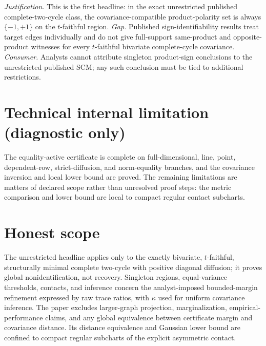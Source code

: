 \documentclass{article}
\begin{document}
\par\smallskip\noindent \textit{Justification.} This is the first headline: in the exact unrestricted published complete-two-cycle class, the covariance-compatible product-polarity set is always \(\{-1,+1\}\) on the \(t\)-faithful region. \textit{Gap.} Published sign-identifiability results treat target edges individually and do not give full-support same-product and opposite-product witnesses for every \(t\)-faithful bivariate complete-cycle covariance. \textit{Consumer.} Analysts cannot attribute singleton product-sign conclusions to the unrestricted published SCM; any such conclusion must be tied to additional restrictions.

\section*{Technical internal limitation (diagnostic only)}

The equality-active certificate is complete on full-dimensional, line, point, dependent-row, strict-diffusion, and norm-equality branches, and the covariance inversion and local lower bound are proved. The remaining limitations are matters of declared scope rather than unresolved proof steps: the metric comparison and lower bound are local to compact regular contact subcharts.

\section{Honest scope}

The unrestricted headline applies only to the exactly bivariate, \(t\)-faithful, structurally minimal complete two-cycle with positive diagonal diffusion; it proves global nonidentification, not recovery. Singleton regions, equal-variance thresholds, contacts, and inference concern the analyst-imposed bounded-margin refinement expressed by raw trace ratios, with \(\kappa\) used for uniform covariance inference. The paper excludes larger-graph projection, marginalization, empirical-performance claims, and any global equivalence between certificate margin and covariance distance. Its distance equivalence and Gaussian lower bound are confined to compact regular subcharts of the explicit asymmetric contact.
\end{document}
